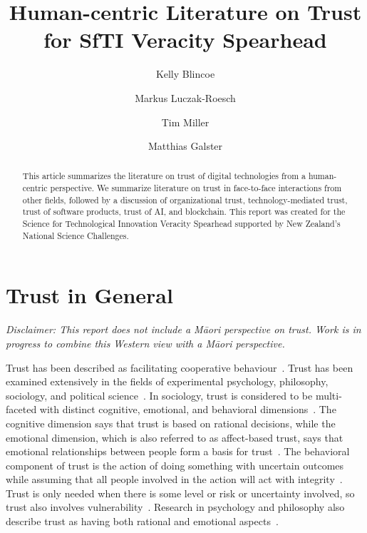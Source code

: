 \documentclass{article}
\begin{document}
\author[1]{Kelly Blincoe}
\author[2]{Markus Luczak-Roesch}
\author[2]{Tim Miller}
\author[3]{Matthias Galster}




\title{Human-centric Literature on Trust for SfTI Veracity Spearhead}
\date{}
\maketitle

\begin{abstract}
    This article summarizes the literature on trust of digital technologies from a human-centric perspective. We summarize literature on trust in face-to-face interactions from other fields, followed by a discussion of organizational trust, technology-mediated trust, trust of software products, trust of AI, and blockchain. This report was created for the Science for Technological Innovation Veracity Spearhead supported by New Zealand's National Science Challenges.
\end{abstract}

\section{Trust in General} 

\textit{Disclaimer: This report does not include a Māori perspective on trust. Work is in progress to combine this Western view with a Māori perspective.}
\vspace{1cm}

Trust has been described as facilitating cooperative behaviour~\cite{shneiderman2000designing}. Trust has been examined extensively in the fields of experimental psychology, philosophy, sociology, and political science~\cite{lewis1985trust}. In sociology, trust is considered to be multi-faceted with distinct cognitive, emotional, and behavioral dimensions~\cite{lewis1985trust}. The cognitive dimension says that trust is based on rational decisions, while the emotional dimension, which is also referred to as affect-based trust, says that emotional relationships between people form a basis for trust~\cite{mcallister1995affect, chowdhury2005role}. The behavioral component of trust is the action of doing something with uncertain outcomes while assuming that all people involved in the action will act with integrity~\cite{barber1983logic}. Trust is only needed when there is some level or risk or uncertainty involved, so trust also involves vulnerability~\cite{wang2005overview}. Research in psychology and philosophy also describe trust as having both rational and emotional aspects~\cite{trvcek2018brief}. 
\end{document}
